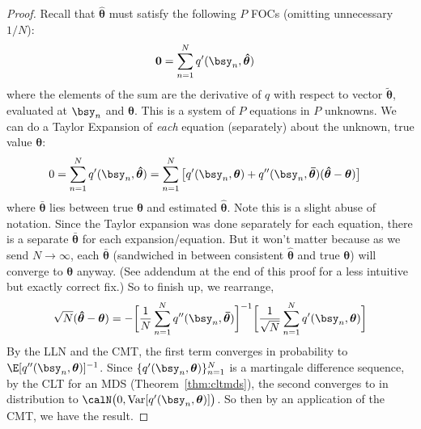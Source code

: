 \documentclass[12pt]{article}
\theoremstyle{plain}
\theoremstyle{definition}
\theoremstyle{remark}
\newcommand{\ra}{\rightarrow}
\newcommand{\bstheta}{\boldsymbol{\theta}}
\newcommand{\bshattheta}{\boldsymbol{\hat{\theta}}}
\newcommand{\bsbartheta}{\boldsymbol{\bar{\theta}}}
\newcommand{\bstildetheta}{\boldsymbol{\tilde{\theta}}}
\renewcommand{\bso}{\boldsymbol{0}}
\newcommand{\Var}{\operatorname{Var}}
\newcommand{\dto}{\xrightarrow{d}}
\newcommand{\sumnN}{\sum^N_{n=1}}
\newcommand{\nN}{_{n=1}^N}
\begin{document}
\begin{proof}
Recall that $\bshattheta$ must satisfy the following $P$ FOCs (omitting
unnecessary $1/N$):
\begin{align}
  \bso &=
  \sumnN q'(\bsy_n,\bshattheta)
  \label{Mestfoc}
\end{align}
where the elements of the sum are the derivative of $q$ with respect to
vector $\bstildetheta$, evaluated at $\bsy_n$ and $\bshattheta$. This is
a system of $P$ equations in $P$ unknowns.  We can do a Taylor Expansion
of \emph{each} equation (separately) about the unknown, true value
$\bstheta$:
\begin{align*}
  0 &=
  \sumnN q'(\bsy_n,\bshattheta)
  =
  \sumnN
  \big[
  q'(\bsy_n,\bstheta)
  +
  q''(\bsy_n,\bsbartheta)
  (\bshattheta-\bstheta)
  \big]
\end{align*}
where $\bsbartheta$ lies between true $\bstheta$ and estimated
$\bshattheta$. Note this is a slight abuse of notation. Since the
Taylor expansion was done separately for each equation, there is a
separate $\bsbartheta$ for each expansion/equation. But it won't matter
because as we send $N\ra\infty$, each $\bsbartheta$ (sandwiched
in between consistent $\bshattheta$ and true $\bstheta$) will converge
to $\bstheta$ anyway. (See addendum at the end of this proof for a less
intuitive but exactly correct fix.)
So to finish up, we rearrange,
\begin{align*}
  \sqrt{N}(\bshattheta-\bstheta)
  =
  -
  \bigg[
  \frac{1}{N}
  \sumnN
  q''(\bsy_n,\bsbartheta)
  \bigg]^{-1}
  \bigg[
  \frac{1}{\sqrt{N}}
  \sumnN
  q'(\bsy_n,\bstheta)
  \bigg]
\end{align*}
By the LLN and the CMT, the first term converges in probability to
$\E[q''(\bsy_n,\bstheta)]^{-1}$.
Since $\{q'(\bsy_n,\bstheta)\}\nN$ is a martingale difference sequence,
by the CLT for an MDS (Theorem~\ref{thm:cltmds}), the second converges
to in distribution to $\calN\big(0,\Var[q'(\bsy_n,\bstheta)]\big)$.
So then by an application of the CMT, we have the result.
\end{proof}
\end{document}
